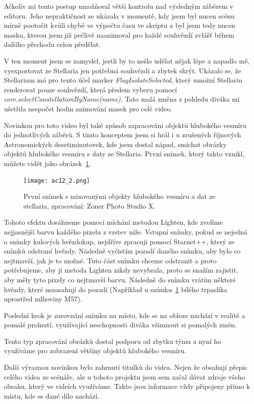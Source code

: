 \documentclass[12pt,a4paper,titlepage]{article}
\begin{document}
Ačkoliv mi tento postup umožňoval větší kontrolu nad výsledným záběrem v editoru. Jeho nepraktičnost se ukázala v momentě, kdy jsem byl nucen scénu mírně pootočit kvůli chybě ve výpočtu času ve skriptu a byl jsem tedy nucen masku, kterou jsem již pečlivě naanimoval pro každé souhvězdí zvlášť během dalšího přechodu celou předělat.

V ten moment jsem se zamyslel, jestli by to nešlo udělat nějak lépe a napadlo mě, vyexportovat ze Stellaria jen potřebná souhvězdí a zbytek skrýt. Ukázalo se, že Stellarium má pro tento účel marker \textit{FlagIsolateSelected}, který umožní Stellariu renderovat pouze souhvězdí, která předem vyberu pomocí \textit{core.\-select\-Constellation\-By\-Name(name)}. Tato malá změna z pohledu diváka mi ušetřila nespočet hodin animování masek pro celé video. %

Novinkou pro toto video byl také způsob zapracování objektů hlubokého vesmíru do jednotlivých záběrů. S tímto konceptem jsem si hrál i u zrušených říjnových Astronomických desetiminutovek, kde jsem dostal nápad, smíchat obrázky objektů hlubokého vesmíru s daty ze Stellaria. První snímek, který takto vznikl, můžete vidět jako obrázek~\ref{prac:ac12_2}. 

\begin{figure}[h]
	\centering
	\texttt{[image: ac12\_2.png]}
	\caption{První snímek s mixovanými objekty hlubokého vesmíru a dat ze stellaria, zpracování: Zoner Photo Studio X.}\label{prac:ac12_2}
\end{figure}

Tohoto efektu dosáhneme pomocí míchání metodou Lighten, kde zvolíme nejjasnější barvu každého pixelu z vrstev níže. Vstupní snímky, pokud se nejedná o snímky kulových hvězdokup, nejdříve zpracuji pomocí Starnet++, který ze snímků odstraní hvězdy. Následně vyčistím pozadí daného snímku, aby bylo co nejtmavší, jak je to možné. Tuto část snímku chceme odstranit a proto potřebujeme, aby ji metoda Lighten nikdy nevybrala, proto se snažím zajistit, aby měly tyto pixely co nejtmavší barvu. Následně do snímku vrátím některé hvězdy, které nezasahují do pozadí (Například u snímku~\ref{prac:ac12_2} bílého trpaslíka uprostřed mlhoviny M57).

Poslední krok je zarovnání snímku na místo, kde se na obloze nachází v realitě a pomalé prolnutí, využívající neschopnosti diváka všimnout si pomalých změn.

Tento typ zpracování obrázků dostal podporu od zbytku týmu a nyní ho využíváme pro zobrazení většiny objektů hlubokého vesmíru.

Další výraznou novinkou bylo zahrnutí titulků do videa. Nejen že obsahují přepis celého videa ze scénáře, ale u tohoto projektu jsem sem začal dávat zdroje všeho obsahu, který ve videích využíváme. Takto jsou informace vždy připojeny přímo k místu, kde se dané dílo nachází.
\end{document}
